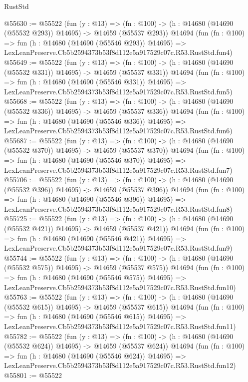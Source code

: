 \begin{lexlean}{RustStd}
\begin{coremodule}
@55630 := @55522
    (fun (y : @13) =>
    (fn : @100) -> (h : @14680 (@14690 (@55532 @293)) @14695) -> @14659 (@55537 @293))
    @14694
    (fun (fn : @100) =>
    fun (h : @14680 (@14690 (@55546 @293)) @14695) =>
    LexLeanPreserve.Cb5b2594373b53f8d112e5a917529c07c.R53.RustStd.fun4)
@55649 := @55522
    (fun (y : @13) =>
    (fn : @100) -> (h : @14680 (@14690 (@55532 @331)) @14695) -> @14659 (@55537 @331))
    @14694
    (fun (fn : @100) =>
    fun (h : @14680 (@14690 (@55546 @331)) @14695) =>
    LexLeanPreserve.Cb5b2594373b53f8d112e5a917529c07c.R53.RustStd.fun5)
@55668 := @55522
    (fun (y : @13) =>
    (fn : @100) -> (h : @14680 (@14690 (@55532 @336)) @14695) -> @14659 (@55537 @336))
    @14694
    (fun (fn : @100) =>
    fun (h : @14680 (@14690 (@55546 @336)) @14695) =>
    LexLeanPreserve.Cb5b2594373b53f8d112e5a917529c07c.R53.RustStd.fun6)
@55687 := @55522
    (fun (y : @13) =>
    (fn : @100) -> (h : @14680 (@14690 (@55532 @370)) @14695) -> @14659 (@55537 @370))
    @14694
    (fun (fn : @100) =>
    fun (h : @14680 (@14690 (@55546 @370)) @14695) =>
    LexLeanPreserve.Cb5b2594373b53f8d112e5a917529c07c.R53.RustStd.fun7)
@55706 := @55522
    (fun (y : @13) =>
    (fn : @100) -> (h : @14680 (@14690 (@55532 @396)) @14695) -> @14659 (@55537 @396))
    @14694
    (fun (fn : @100) =>
    fun (h : @14680 (@14690 (@55546 @396)) @14695) =>
    LexLeanPreserve.Cb5b2594373b53f8d112e5a917529c07c.R53.RustStd.fun8)
@55725 := @55522
    (fun (y : @13) =>
    (fn : @100) -> (h : @14680 (@14690 (@55532 @421)) @14695) -> @14659 (@55537 @421))
    @14694
    (fun (fn : @100) =>
    fun (h : @14680 (@14690 (@55546 @421)) @14695) =>
    LexLeanPreserve.Cb5b2594373b53f8d112e5a917529c07c.R53.RustStd.fun9)
@55744 := @55522
    (fun (y : @13) =>
    (fn : @100) -> (h : @14680 (@14690 (@55532 @575)) @14695) -> @14659 (@55537 @575))
    @14694
    (fun (fn : @100) =>
    fun (h : @14680 (@14690 (@55546 @575)) @14695) =>
    LexLeanPreserve.Cb5b2594373b53f8d112e5a917529c07c.R53.RustStd.fun10)
@55763 := @55522
    (fun (y : @13) =>
    (fn : @100) -> (h : @14680 (@14690 (@55532 @615)) @14695) -> @14659 (@55537 @615))
    @14694
    (fun (fn : @100) =>
    fun (h : @14680 (@14690 (@55546 @615)) @14695) =>
    LexLeanPreserve.Cb5b2594373b53f8d112e5a917529c07c.R53.RustStd.fun11)
@55782 := @55522
    (fun (y : @13) =>
    (fn : @100) -> (h : @14680 (@14690 (@55532 @624)) @14695) -> @14659 (@55537 @624))
    @14694
    (fun (fn : @100) =>
    fun (h : @14680 (@14690 (@55546 @624)) @14695) =>
    LexLeanPreserve.Cb5b2594373b53f8d112e5a917529c07c.R53.RustStd.fun12)
@55801 := @55522

\end{coremodule}
\end{lexlean}
